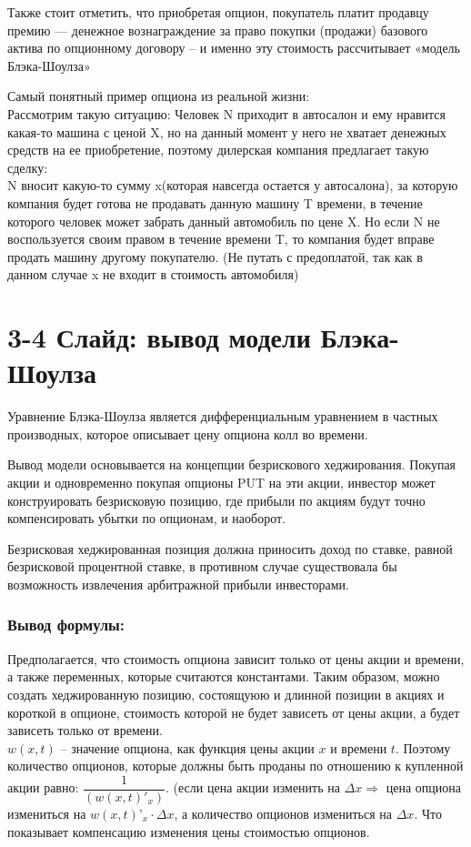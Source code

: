 \documentclass[a4paper]{article}
\begin{document}
Также стоит отметить, что приобретая опцион, покупатель платит продавцу премию — денежное вознаграждение за право покупки (продажи) базового актива по опционному договору -- и именно эту стоимость рассчитывает «модель Блэка-Шоулза»

Самый понятный пример опциона из реальной жизни:\\
Рассмотрим такую ситуацию:
Человек N приходит в автосалон и ему нравится какая-то машина с ценой X, но на данный момент у него не хватает денежных средств на ее приобретение, поэтому дилерская компания предлагает такую сделку:\\
N вносит какую-то сумму x(которая навсегда остается у автосалона), за которую компания будет готова не продавать данную машину T времени, в течение которого человек может забрать данный автомобиль по цене X.
Но если N не воспользуется своим правом в течение времени T, то компания будет вправе продать машину другому покупателю.
(Не путать с предоплатой, так как в данном случае x не входит в стоимость автомобиля)

\section*{3-4 Слайд: вывод модели Блэка-Шоулза}
Уравнение Блэка-Шоулза является дифференциальным уравнением в частных производных, которое описывает цену опциона колл во времени.

Вывод модели основывается на концепции безрискового хеджирования. Покупая акции и одновременно покупая опционы PUT на эти акции, инвестор может конструировать безрисковую позицию, где прибыли по акциям будут точно компенсировать убытки по опционам, и наоборот.

Безрисковая хеджированная позиция должна приносить доход по ставке, равной безрисковой процентной ставке, в противном случае существовала бы возможность извлечения арбитражной прибыли инвесторами.

\subsubsection*{Вывод формулы:}
Предполагается, что стоимость опциона зависит только от цены акции и времени, а также переменных, которые считаются константами. Таким образом, можно создать хеджированную позицию, состоящуюю и длинной позиции в акциях и короткой в опционе, стоимость которой не будет зависеть от цены акции, а будет зависеть только от времени. \\
$w(x, t)$ -- значение опциона, как функция цены акции $x$ и времени $t$. Поэтому количество опционов, которые должны быть проданы по отношению к купленной акции равно: $\dfrac{1}{(w(x,t)'_x)}$. (если цена акции изменить на $\Delta x \Rightarrow$  цена опциона измениться на $w(x,t)’_x \cdot \Delta x$, а количество опционов измениться на $\Delta x$. Что показывает компенсацию изменения цены стоимостью опционов.
\end{document}
